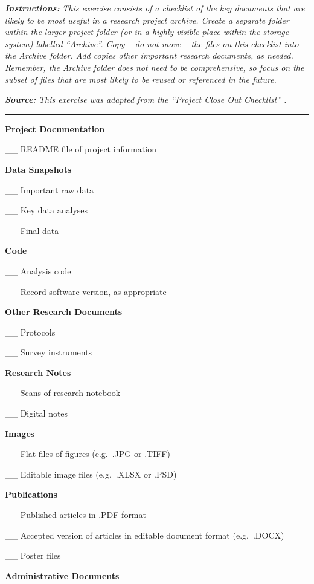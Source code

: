 \documentclass[
]{book}
\begin{document}
\textbf{\emph{Instructions:}} \emph{This exercise consists of a checklist of the key documents that are likely to be most useful in a research project archive. Create a separate folder within the larger project folder (or in a highly visible place within the storage system) labelled ``Archive''. Copy -- do not move -- the files on this checklist into the Archive folder. Add copies other important research documents, as needed. Remember, the Archive folder does not need to be comprehensive, so focus on the subset of files that are most likely to be reused or referenced in the future.}

\textbf{\emph{Source:}} \emph{This exercise was adapted from the ``Project Close Out Checklist'' \citep{briney_project_2020}.}

\begin{center}\rule{0.5\linewidth}{0.5pt}\end{center}

\textbf{Project Documentation}

\_\_ README file of project information

\textbf{Data Snapshots}

\_\_ Important raw data

\_\_ Key data analyses

\_\_ Final data

\textbf{Code}

\_\_ Analysis code

\_\_ Record software version, as appropriate

\textbf{Other Research Documents}

\_\_ Protocols

\_\_ Survey instruments

\textbf{Research Notes}

\_\_ Scans of research notebook

\_\_ Digital notes

\textbf{Images}

\_\_ Flat files of figures (e.g.~.JPG or .TIFF)

\_\_ Editable image files (e.g.~.XLSX or .PSD)

\textbf{Publications}

\_\_ Published articles in .PDF format

\_\_ Accepted version of articles in editable document format (e.g.~.DOCX)

\_\_ Poster files

\textbf{Administrative Documents}
\end{document}
